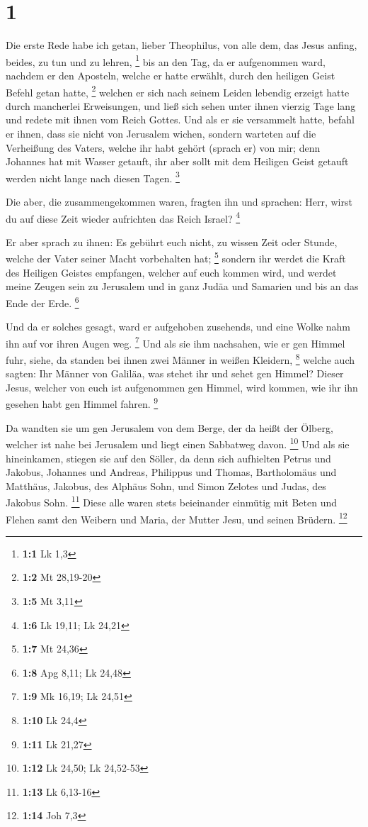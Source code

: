 \hypertarget{section}{%
\section{1}\label{section}}

 Die erste Rede habe ich getan, lieber Theophilus, von
alle dem, das Jesus anfing, beides, zu tun und zu lehren, \footnote{\textbf{1:1}
  Lk 1,3}  bis an den Tag, da er aufgenommen ward, nachdem
er den Aposteln, welche er hatte erwählt, durch den heiligen Geist
Befehl getan hatte, \footnote{\textbf{1:2} Mt 28,19-20} 
welchen er sich nach seinem Leiden lebendig erzeigt hatte durch
mancherlei Erweisungen, und ließ sich sehen unter ihnen vierzig Tage
lang und redete mit ihnen vom Reich Gottes.  Und als er
sie versammelt hatte, befahl er ihnen, dass sie nicht von Jerusalem
wichen, sondern warteten auf die Verheißung des Vaters, welche ihr habt
gehört (sprach er) von mir;  denn Johannes hat mit Wasser
getauft, ihr aber sollt mit dem Heiligen Geist getauft werden nicht
lange nach diesen Tagen. \footnote{\textbf{1:5} Mt 3,11}

 Die aber, die zusammengekommen waren, fragten ihn und
sprachen: Herr, wirst du auf diese Zeit wieder aufrichten das Reich
Israel? \footnote{\textbf{1:6} Lk 19,11; Lk 24,21}

 Er aber sprach zu ihnen: Es gebührt euch nicht, zu wissen
Zeit oder Stunde, welche der Vater seiner Macht vorbehalten hat;
\footnote{\textbf{1:7} Mt 24,36}  sondern ihr werdet die
Kraft des Heiligen Geistes empfangen, welcher auf euch kommen wird, und
werdet meine Zeugen sein zu Jerusalem und in ganz Judäa und Samarien und
bis an das Ende der Erde. \footnote{\textbf{1:8} Apg 8,11; Lk 24,48}

 Und da er solches gesagt, ward er aufgehoben zusehends,
und eine Wolke nahm ihn auf vor ihren Augen weg. \footnote{\textbf{1:9}
  Mk 16,19; Lk 24,51}  Und als sie ihm nachsahen, wie er
gen Himmel fuhr, siehe, da standen bei ihnen zwei Männer in weißen
Kleidern, \footnote{\textbf{1:10} Lk 24,4}  welche auch
sagten: Ihr Männer von Galiläa, was stehet ihr und sehet gen Himmel?
Dieser Jesus, welcher von euch ist aufgenommen gen Himmel, wird kommen,
wie ihr ihn gesehen habt gen Himmel fahren. \footnote{\textbf{1:11} Lk
  21,27}

 Da wandten sie um gen Jerusalem von dem Berge, der da
heißt der Ölberg, welcher ist nahe bei Jerusalem und liegt einen
Sabbatweg davon. \footnote{\textbf{1:12} Lk 24,50; Lk 24,52-53}
 Und als sie hineinkamen, stiegen sie auf den Söller, da
denn sich aufhielten Petrus und Jakobus, Johannes und Andreas, Philippus
und Thomas, Bartholomäus und Matthäus, Jakobus, des Alphäus Sohn, und
Simon Zelotes und Judas, des Jakobus Sohn. \footnote{\textbf{1:13} Lk
  6,13-16}  Diese alle waren stets beieinander einmütig
mit Beten und Flehen samt den Weibern und Maria, der Mutter Jesu, und
seinen Brüdern. \footnote{\textbf{1:14} Joh 7,3}

